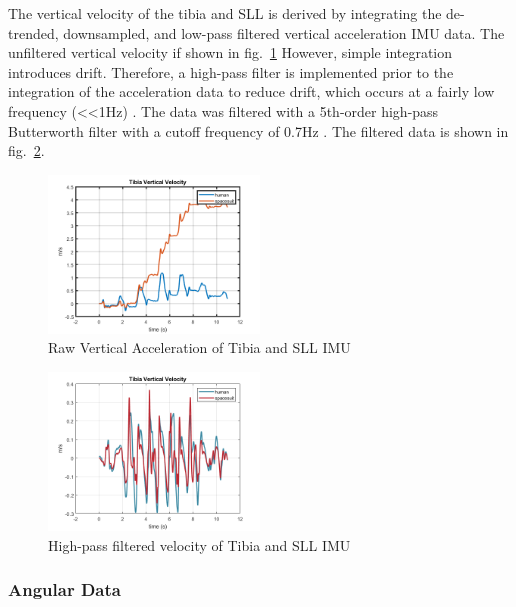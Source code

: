 \documentclass[defaultstyle,11pt]{comps}
\begin{document}
The vertical velocity of the tibia and SLL is derived by integrating the de-trended, downsampled, and low-pass filtered vertical acceleration IMU data.
The unfiltered vertical velocity if shown in fig.~\ref{fig:SA1-TibVertRaw}
However, simple integration introduces drift.
Therefore, a high-pass filter is implemented prior to the integration of the acceleration data to reduce drift, which occurs at a fairly low frequency (\textless\textless1Hz) \citep{Sekar2015}. The data was filtered with a 5th-order high-pass Butterworth filter with a cutoff frequency of 0.7Hz \citep{Ribeiro1999}. The filtered data is shown in fig.~\ref{fig:SA1-TibVertFilt}.

\begin{figure}
\hypertarget{fig:SA1-TibVertRaw}{%
\centering
\includegraphics[width=0.5\textwidth,height=\textheight]{../fig/SA1/S3C0T1R_VVel.png}
\caption{Raw Vertical Acceleration of Tibia and SLL IMU}\label{fig:SA1-TibVertRaw}
}
\end{figure}

\begin{figure}
\hypertarget{fig:SA1-TibVertFilt}{%
\centering
\includegraphics[width=0.5\textwidth,height=\textheight]{../fig/SA1/S3C0T1R_VVel_HPF.png}
\caption{High-pass filtered velocity of Tibia and SLL IMU}\label{fig:SA1-TibVertFilt}
}
\end{figure}

\hypertarget{angular-data}{%
\subsubsection{Angular Data}\label{angular-data}}
\end{document}
